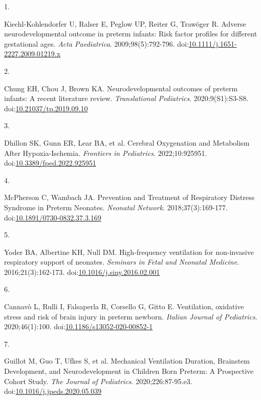 \documentclass[
  letterpaper,
  DIV=11,
  numbers=noendperiod]{scrartcl}
\newlength{\cslhangindent}
\newlength{\csllabelwidth}
\newenvironment{CSLReferences}[2] %
 {\begin{list}{}{%
  \setlength{\itemindent}{0pt}
  \setlength{\leftmargin}{0pt}
  \setlength{\parsep}{0pt}
  \ifodd #1
   \setlength{\leftmargin}{\cslhangindent}
   \setlength{\itemindent}{-1\cslhangindent}
  \fi
  \setlength{\itemsep}{#2\baselineskip}}}
 {\end{list}}
\newcommand{\CSLLeftMargin}[1]{\parbox[t]{\csllabelwidth}{\strut#1\strut}}
\newcommand{\CSLRightInline}[1]{\parbox[t]{\linewidth - \csllabelwidth}{\strut#1\strut}}
\begin{document}
\label{refs}
\begin{CSLReferences}{0}{1}
\CSLLeftMargin{1. }%
\CSLRightInline{Kiechl-Kohlendorfer U, Ralser E, Peglow UP, Reiter G,
Trawöger R. Adverse neurodevelopmental outcome in preterm infants: Risk
factor profiles for different gestational ages. \emph{Acta Paediatrica}.
2009;98(5):792-796.
doi:\href{https://doi.org/10.1111/j.1651-2227.2009.01219.x}{10.1111/j.1651-2227.2009.01219.x}}

\CSLLeftMargin{2. }%
\CSLRightInline{Chung EH, Chou J, Brown KA. Neurodevelopmental outcomes
of preterm infants: A recent literature review. \emph{Translational
Pediatrics}. 2020;9(S1):S3-S8.
doi:\href{https://doi.org/10.21037/tp.2019.09.10}{10.21037/tp.2019.09.10}}

\CSLLeftMargin{3. }%
\CSLRightInline{Dhillon SK, Gunn ER, Lear BA, et al. Cerebral
{Oxygenation} and {Metabolism After Hypoxia-Ischemia}. \emph{Frontiers
in Pediatrics}. 2022;10:925951.
doi:\href{https://doi.org/10.3389/fped.2022.925951}{10.3389/fped.2022.925951}}

\CSLLeftMargin{4. }%
\CSLRightInline{McPherson C, Wambach JA. Prevention and {Treatment} of
{Respiratory Distress Syndrome} in {Preterm Neonates}. \emph{Neonatal
Network}. 2018;37(3):169-177.
doi:\href{https://doi.org/10.1891/0730-0832.37.3.169}{10.1891/0730-0832.37.3.169}}

\CSLLeftMargin{5. }%
\CSLRightInline{Yoder BA, Albertine KH, Null DM. High-frequency
ventilation for non-invasive respiratory support of neonates.
\emph{Seminars in Fetal and Neonatal Medicine}. 2016;21(3):162-173.
doi:\href{https://doi.org/10.1016/j.siny.2016.02.001}{10.1016/j.siny.2016.02.001}}

\CSLLeftMargin{6. }%
\CSLRightInline{Cannavò L, Rulli I, Falsaperla R, Corsello G, Gitto E.
Ventilation, oxidative stress and risk of brain injury in preterm
newborn. \emph{Italian Journal of Pediatrics}. 2020;46(1):100.
doi:\href{https://doi.org/10.1186/s13052-020-00852-1}{10.1186/s13052-020-00852-1}}

\CSLLeftMargin{7. }%
\CSLRightInline{Guillot M, Guo T, Ufkes S, et al. Mechanical
{Ventilation Duration}, {Brainstem Development}, and {Neurodevelopment}
in {Children Born Preterm}: {A Prospective Cohort Study}. \emph{The
Journal of Pediatrics}. 2020;226:87-95.e3.
doi:\href{https://doi.org/10.1016/j.jpeds.2020.05.039}{10.1016/j.jpeds.2020.05.039}}


\end{CSLReferences}
\end{document}
